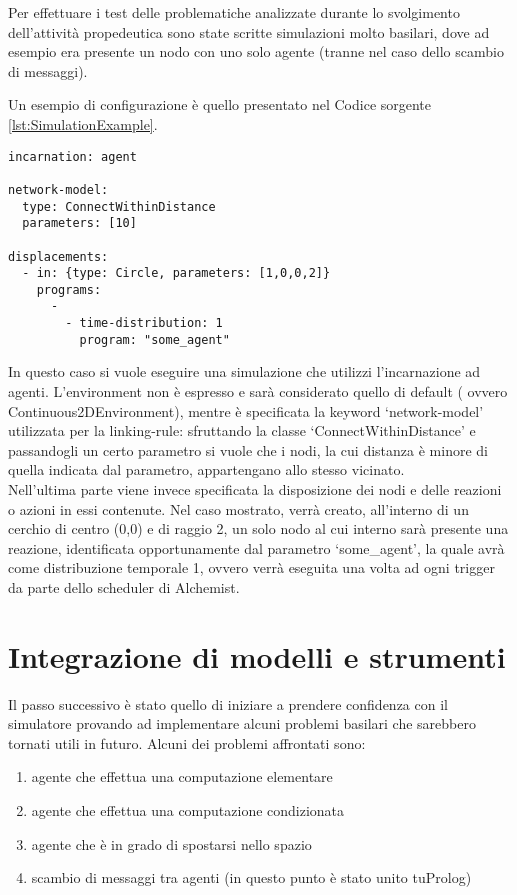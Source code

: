 Per effettuare i test delle problematiche analizzate durante lo svolgimento dell'attività propedeutica sono state scritte simulazioni molto basilari, dove ad esempio era presente un nodo con uno solo agente (tranne nel caso dello scambio di messaggi).

Un esempio di configurazione è quello presentato nel Codice sorgente \ref{lst:SimulationExample}.

\lstset{
  basicstyle=\ttfamily,
  captionpos=b,
  frame=tb,
  numbers=left
}

\medskip
\begin{lstlisting}[firstnumber=1,label={lst:SimulationExample},caption={Esempio configurazione di una simulazione}]
incarnation: agent

network-model:
  type: ConnectWithinDistance
  parameters: [10]

displacements:
  - in: {type: Circle, parameters: [1,0,0,2]}
    programs:
      -
        - time-distribution: 1
          program: "some_agent"
\end{lstlisting}

In questo caso si vuole eseguire una simulazione che utilizzi l'incarnazione ad agenti. L'environment non è espresso e sarà considerato quello di default ( ovvero Continuous2DEnvironment), mentre è specificata la keyword `network-model' utilizzata per la linking-rule: sfruttando la classe `ConnectWithinDistance' e passandogli un certo parametro si vuole che i nodi, la cui distanza è minore di quella indicata dal parametro, appartengano allo stesso vicinato.
\\
Nell'ultima parte viene invece specificata la disposizione dei nodi e delle reazioni o azioni in essi contenute. Nel caso mostrato, verrà creato, all'interno di un cerchio di centro (0,0) e di raggio 2, un solo nodo al cui interno sarà presente una reazione, identificata opportunamente dal parametro `some\_agent', la quale avrà come distribuzione temporale 1, ovvero verrà eseguita una volta ad ogni trigger da parte dello scheduler di Alchemist.

\section{Integrazione di modelli e strumenti}
Il passo successivo è stato quello di iniziare a prendere confidenza con il simulatore provando ad implementare alcuni problemi basilari che sarebbero tornati utili in futuro. Alcuni dei problemi affrontati sono:
\begin{enumerate}
\item agente che effettua una computazione elementare
\item agente che effettua una computazione condizionata
\item agente che è in grado di spostarsi nello spazio
\item scambio di messaggi tra agenti (in questo punto è stato unito tuProlog)
\end{enumerate}

